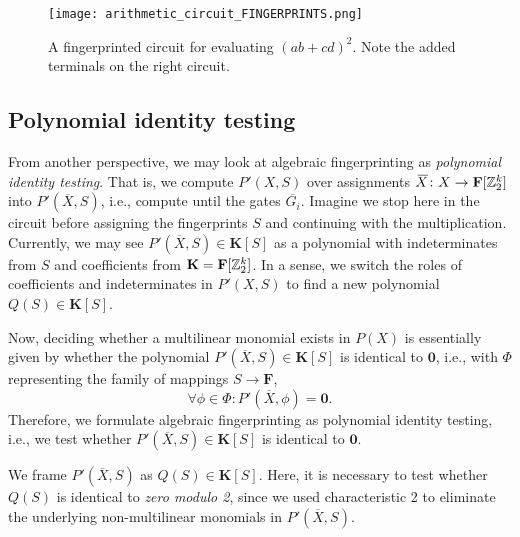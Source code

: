 \begin{figure}[h]
  \texttt{[image: arithmetic\_circuit\_FINGERPRINTS.png]}
  \centering
  \caption{A fingerprinted circuit for evaluating $(ab+cd)^2$. 
  Note the added terminals on the right circuit.}
  \label{fig:circuit_fingerprints}
\end{figure}

\subsection{Polynomial identity testing}
\label{sect:polynomial_identity_testing}

From another perspective, we may look at algebraic fingerprinting as \emph{polynomial identity testing}. 
That is, we compute $P'(X, S)$ over assignments 
$\,\overline{\!{X}} \colon X \to \mathbf{F}[\mathbb Z_2^k]$ into $P'(\overbar{X}, S)$, i.e., 
compute until the gates $\overbar{G_i}$. 
Imagine we stop here in the circuit before assigning the fingerprints $S$ 
and continuing with the multiplication. 
Currently, we may see $P'(\overbar{X}, S) \in \mathbf{K}[S]$ as a polynomial 
with indeterminates from $S$ and coefficients from $\mathbf{K} = \mathbf{F}[\mathbb Z_2^k]$. 
In a sense, we switch the roles of coefficients and indeterminates in $P'(X, S)$ 
to find a new polynomial $Q(S) \in \mathbf{K}[S]$. 

Now, deciding whether a multilinear monomial exists in $P(X)$ is essentially given by 
whether the polynomial $P'(\overbar{X}, S) \in \mathbf{K}[S]$ is identical to $\mathbf{0}$, 
i.e., with $\Phi$ representing the family of mappings $S \to \mathbf{F}$, 
\[
  \forall \phi \in \Phi %
  \colon P'(\overbar{X}, \phi) = \mathbf{0}.
\]
Therefore, we formulate algebraic fingerprinting as polynomial identity testing, i.e., 
we test whether $P'(\overbar{X}, S) \in \mathbf{K}[S]$ is identical to $\mathbf{0}$.

\begin{problem}
\end{problem}

We frame $P'(\overbar{X}, S)$ as $Q(S) \in \mathbf{K}[S]$. 
Here, it is necessary to test whether $Q(S)$ is identical to \emph{zero modulo 2}, 
since we used characteristic 2 to eliminate 
the underlying non-multilinear monomials in $P'(\overbar{X}, S)$.

